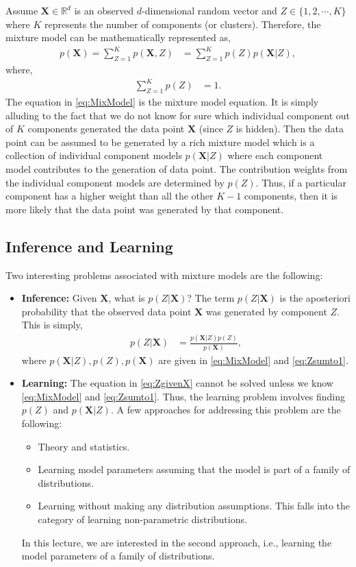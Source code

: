 \documentclass[twoside,11pt,a4paper]{book}
\newcommand{\data}[1]{\mathbf{#1}}
\begin{document}
Assume $\data{X} \in \mathbb{R}^{d}$ is an observed $d$-dimensional random vector and $Z \in \{1, 2, \cdots, K\}$ where $K$ represents the number of components (or clusters). Therefore, the mixture model can be mathematically represented as,
\begin{align}
p(\data{X}) = \sum_{Z = 1}^{K} p(\data{X}, Z) &= \sum_{Z = 1}^{K} p(Z) p(\data{X}|Z), \label{eq:MixModel}
\end{align}
where,
\begin{align}
\sum_{Z = 1}^{K} p(Z) &= 1. \label{eq:Zsumto1}
\end{align}
The equation in \eqref{eq:MixModel} is the mixture model equation. It is simply alluding to the fact that we do not know for sure which individual component out of $K$ components generated the data point $\data{X}$ (since $Z$ is hidden). Then the data point can be assumed to be generated by a rich mixture model which is a collection of individual component models $p(\data{X}|Z)$ where each component model contributes to the generation of data point. The contribution weights from the individual component models are determined by $p(Z)$. Thus, if a particular component has a higher weight than all the other $K - 1$ components, then it is more likely that the data point was generated by that component.


\subsection{Inference and Learning}
Two interesting problems associated with mixture models are the following:
\begin{itemize}
\item \textbf{Inference:} Given $\data{X}$, what is $p(Z|\data{X})$? The term $p(Z|\data{X})$ is the aposteriori probability that the observed data point $\data{X}$ was generated by component $Z$. This is simply,
\begin{align}
p(Z|\data{X}) &= \frac{p(\data{X}|Z)p(Z)}{p(\data{X})}, \label{eq:ZgivenX}
\end{align}
where $p(\data{X}|Z), p(Z), p(\data{X})$ are given in \eqref{eq:MixModel} and \eqref{eq:Zsumto1}.
\item \textbf{Learning:} The equation in \eqref{eq:ZgivenX} cannot be solved unless we know \eqref{eq:MixModel} and \eqref{eq:Zsumto1}. Thus, the learning problem involves finding $p(Z)$ and $p(\data{X}|Z)$. A few approaches for addressing this problem are the following:
\begin{itemize}
\item Theory and statistics.
\item Learning model parameters assuming that the model is part of a family of distributions.
\item Learning without making any distribution assumptions. This falls into the category of learning non-parametric distributions.
\end{itemize}
In this lecture, we are interested in the second approach, i.e., learning the model parameters of a family of distributions.
\end{itemize}
\end{document}
